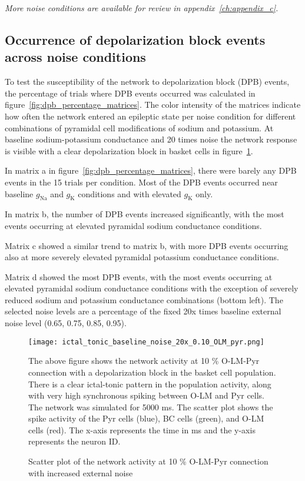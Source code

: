 \noindent
\textit{More noise conditions are available for review in appendix~\ref{ch:appendix_c}.}

\subsection{Occurrence of depolarization block events across noise conditions}
To test the susceptibility of the network to depolarization block (DPB) events, the percentage of trials where DPB events occurred was calculated in figure~\ref{fig:dpb_percentage_matrices}.
The color intensity of the matrices indicate how often the network entered an epileptic state per noise condition for different combinations of pyramidal cell modifications of sodium and potassium.
At baseline sodium-potassium conductance and 20 times noise the network response is visible with a clear depolarization block in basket cells in figure~\ref{fig:scatterplot_1_con_olm_pyr_ext_noise_20x}.

In matrix a in figure~\ref{fig:dpb_percentage_matrices}, there were barely any DPB events in the 15 trials per condition. Most of the DPB events occurred near baseline \(g_{\text{Na}}\) and \(g_{\text{K}}\) conditions and with elevated \(g_{\text{K}}\) only.

In matrix b, the number of DPB events increased significantly, with the most events occurring at elevated pyramidal sodium conductance conditions.

Matrix c showed a similar trend to matrix b, with more DPB events occurring also at more severely elevated pyramidal potassium conductance conditions.

Matrix d showed the most DPB events, with the most events occurring at elevated pyramidal sodium conductance conditions with the exception of severely reduced sodium and potassium conductance combinations (bottom left).
The selected noise levels are a percentage of the fixed 20x times baseline external noise level (0.65, 0.75, 0.85, 0.95).

\begin{figure}[htbp]
    \centering
    \texttt{[image: ictal\_tonic\_baseline\_noise\_20x\_0.10\_OLM\_pyr.png]}
    \caption[10 \% O-LM-Pyr connection with increased external noise scatter plot]{Scatter plot of the network activity at 10 \% O-LM-Pyr connection with increased external noise}\label{fig:scatterplot_1_con_olm_pyr_ext_noise_20x}
    \begin{minipage}{1.0\textwidth}
        The above figure shows the network activity at 10 \% O-LM-Pyr connection with a depolarization block in the basket cell population.
        There is a clear ictal-tonic pattern in the population activity, along with very high synchronous spiking between O-LM and Pyr cells.
        The network was simulated for 5000 ms.
        The scatter plot shows the spike activity of the Pyr cells (blue), BC cells (green), and O-LM cells (red).
        The x-axis represents the time in ms and the y-axis represents the neuron ID\@.
    \end{minipage}
\end{figure}
\pagebreak

